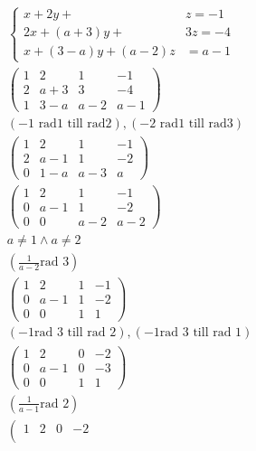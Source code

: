\begin{align*}
  &\quad \left\{\begin{array}{rr}
  x+2 y+ & z=-1 \\
  2 x+(a+3) y+ & 3 z=-4 \\
  x+(3-a) y+(a-2) z & =a-1
  \end{array}\right. \\
  &\quad \left(\begin{array}{ccc|c}
    1 & 2 & 1 & -1 \\
    2 & a+3 & 3 & -4 \\
    1 & 3-a & a-2 & a-1
  \end{array}\right) \\
  &\quad (-1 \text{ rad1 till rad2}), (-2 \text{ rad1 till rad3}) \\
  &\quad \left(\begin{array}{ccc|c}
    1 & 2 & 1 & -1 \\
    2 & a-1 & 1 & -2 \\
    0 & 1-a & a-3 & a
  \end{array}\right) \\
  &\quad \left(\begin{array}{ccc|c}
    1 & 2 & 1 & -1 \\
    0 & a-1 & 1 & -2 \\
    0 & 0 & a-2 & a-2
  \end{array}\right) \\
  &\quad a \neq 1 \land a \neq 2 \\
  &\quad (\frac{1}{a-2} \text{rad 3}) \\
  &\quad \left(\begin{array}{ccc|c}
    1 & 2 & 1 & -1 \\
    0 & a-1 & 1 & -2 \\
    0 & 0 & 1 & 1
  \end{array}\right) \\
  &\quad (-1 \text{rad 3 till rad 2}), (-1 \text{rad 3 till rad 1}) \\
  &\quad \left(\begin{array}{ccc|c}
    1 & 2 & 0 & -2 \\
    0 & a-1 & 0 & -3 \\
    0 & 0 & 1 & 1
  \end{array}\right) \\
  &\quad (\frac{1}{a-1} \text{rad 2}) \\
  &\quad \left(\begin{array}{ccc|c}
    1 & 2 & 0 & -2 \\

\end{array}
\end{align*}
